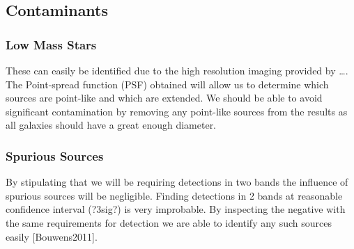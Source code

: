 
\subsection{Contaminants} %
\label{sub:contaminants}
    \subsubsection{Low Mass Stars} %
    \label{ssub:low_mass_stars}
        These can easily be identified due to the high resolution imaging provided by \ldots. The Point-spread function (PSF) obtained will allow us to determine which sources are point-like and which are extended. We should be able to avoid significant contamination by removing any point-like sources from the results as all galaxies should have a great enough diameter.

    \subsubsection{Spurious Sources} %
    \label{ssub:spurious_sources}
        By stipulating that we will be requiring detections in two bands the influence of spurious sources will be negligible. Finding detections in 2 bands at reasonable confidence interval (?3sig?) is very improbable. By inspecting the negative with the same requirements for detection we are able to identify any such sources easily [Bouwens2011].

